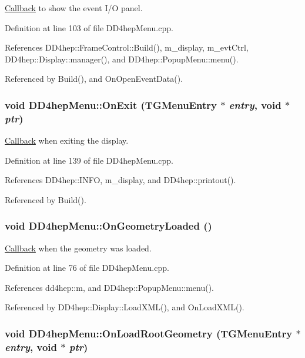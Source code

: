 \hyperlink{class_d_d4hep_1_1_callback}{Callback} to show the event I/O panel. 

Definition at line 103 of file DD4hepMenu.cpp.

References DD4hep::FrameControl::Build(), m\_\-display, m\_\-evtCtrl, DD4hep::Display::manager(), and DD4hep::PopupMenu::menu().

Referenced by Build(), and OnOpenEventData().\hypertarget{class_d_d4hep_1_1_d_d4hep_menu_a62954b16db94eb57f3c88600042f1a3e}{
\subsubsection[{OnExit}]{\setlength{\rightskip}{0pt plus 5cm}void DD4hepMenu::OnExit (TGMenuEntry $\ast$ {\em entry}, \/  void $\ast$ {\em ptr})}}
\label{class_d_d4hep_1_1_d_d4hep_menu_a62954b16db94eb57f3c88600042f1a3e}


\hyperlink{class_d_d4hep_1_1_callback}{Callback} when exiting the display. 

Definition at line 139 of file DD4hepMenu.cpp.

References DD4hep::INFO, m\_\-display, and DD4hep::printout().

Referenced by Build().\hypertarget{class_d_d4hep_1_1_d_d4hep_menu_a4cc12c7e0047c638119e0807f860fbc1}{
\subsubsection[{OnGeometryLoaded}]{\setlength{\rightskip}{0pt plus 5cm}void DD4hepMenu::OnGeometryLoaded ()}}
\label{class_d_d4hep_1_1_d_d4hep_menu_a4cc12c7e0047c638119e0807f860fbc1}


\hyperlink{class_d_d4hep_1_1_callback}{Callback} when the geometry was loaded. 

Definition at line 76 of file DD4hepMenu.cpp.

References dd4hep::m, and DD4hep::PopupMenu::menu().

Referenced by DD4hep::Display::LoadXML(), and OnLoadXML().\hypertarget{class_d_d4hep_1_1_d_d4hep_menu_a4bc97ab3803f51bf9d271dd88781d6be}{
\subsubsection[{OnLoadRootGeometry}]{\setlength{\rightskip}{0pt plus 5cm}void DD4hepMenu::OnLoadRootGeometry (TGMenuEntry $\ast$ {\em entry}, \/  void $\ast$ {\em ptr})}}
\label{class_d_d4hep_1_1_d_d4hep_menu_a4bc97ab3803f51bf9d271dd88781d6be}


